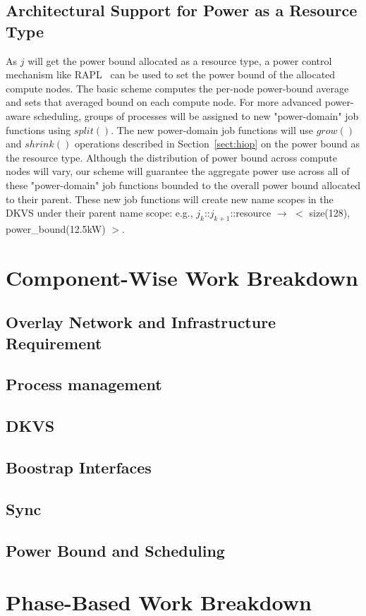 \documentclass[10pt]{article}
\begin{document}
\subsection{Architectural Support for Power as a Resource Type} 
As $j$ will get the power bound allocated as a resource type, 
a power control mechanism like RAPL~\cite{RountreeRAPL} can be used 
to set the power bound of the allocated compute nodes. 
The basic scheme computes the per-node power-bound average 
and sets that averaged bound on each compute node.
For more advanced power-aware scheduling, groups of processes will
be assigned to new "power-domain" job functions using $split()$. 
The new power-domain job functions will use $grow()$ and $shrink()$ 
operations described in Section~\ref{sect:hiop} 
on the power bound as the resource type.
Although the distribution of power bound across compute
nodes will vary, our scheme will guarantee the aggregate power use 
across all of these "power-domain" job functions bounded to the overall power bound 
allocated to their parent. 
These new job functions will create new name scopes 
in the DKVS under their parent name scope: 
e.g., $j_k$::$j_{k+1}$::resource $\rightarrow$ $<$ size(128), power\_bound(12.5kW) $>$.


\section{Component-Wise Work Breakdown}

\subsection{Overlay Network and Infrastructure Requirement}

\subsection{Process management}

\subsection{DKVS}

\subsection{Boostrap Interfaces}

\subsection{Sync}

\subsection{Power Bound and Scheduling}

\section{Phase-Based Work Breakdown}



\end{document}
